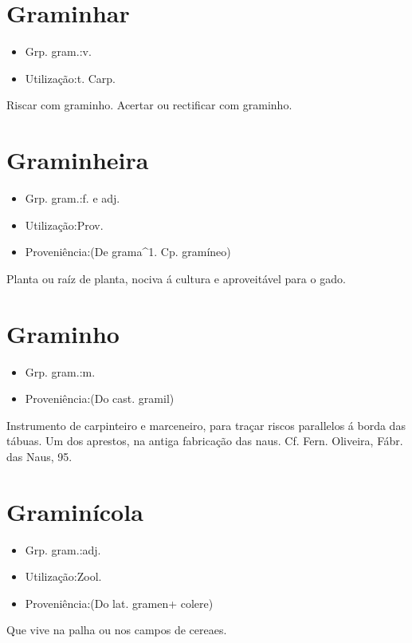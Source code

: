 \section{Graminhar}
\begin{itemize}
\item {Grp. gram.:v.}
\end{itemize}
\begin{itemize}
\item {Utilização:t. Carp.}
\end{itemize}
Riscar com graminho.
Acertar ou rectificar com graminho.
\section{Graminheira}
\begin{itemize}
\item {Grp. gram.:f.  e  adj.}
\end{itemize}
\begin{itemize}
\item {Utilização:Prov.}
\end{itemize}
\begin{itemize}
\item {Proveniência:(De \textunderscore grama\textunderscore ^1. Cp. \textunderscore gramíneo\textunderscore )}
\end{itemize}
Planta ou raíz de planta, nociva á cultura e aproveitável para o gado.
\section{Graminho}
\begin{itemize}
\item {Grp. gram.:m.}
\end{itemize}
\begin{itemize}
\item {Proveniência:(Do cast. \textunderscore gramil\textunderscore )}
\end{itemize}
Instrumento de carpinteiro e marceneiro, para traçar riscos parallelos á borda das tábuas.
Um dos aprestos, na antiga fabricação das naus. Cf. Fern. Oliveira, \textunderscore Fábr. das Naus\textunderscore , 95.
\section{Graminícola}
\begin{itemize}
\item {Grp. gram.:adj.}
\end{itemize}
\begin{itemize}
\item {Utilização:Zool.}
\end{itemize}
\begin{itemize}
\item {Proveniência:(Do lat. \textunderscore gramen\textunderscore  + \textunderscore colere\textunderscore )}
\end{itemize}
Que vive na palha ou nos campos de cereaes.

